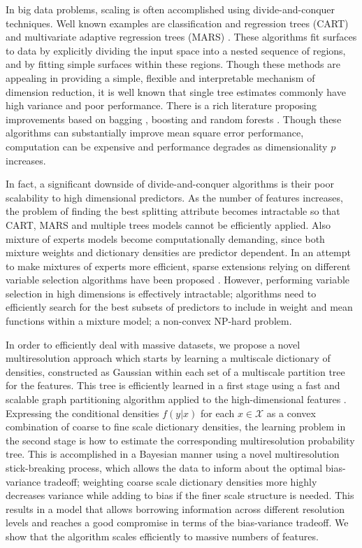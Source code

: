 \documentclass{article}
\begin{document}
In big data problems, scaling is often accomplished using divide-and-conquer techniques. Well known examples are classification and regression trees (CART) \cite{CART} and multivariate adaptive regression trees (MARS) \cite{MARS}. These algorithms fit surfaces to data by explicitly dividing the input space into a nested sequence of regions, and by fitting simple surfaces  within these regions. Though these methods are appealing in providing a simple, flexible and interpretable mechanism of dimension reduction, it is well known that single tree estimates commonly have high variance and poor performance.  There is a rich literature proposing improvements based on bagging \cite{Bagging}, boosting \cite{Boosting} and random forests \cite{RandomForest}. Though these algorithms can substantially improve mean square error performance, computation can be expensive and performance degrades as dimensionality $p$ increases.

In fact, a significant downside of divide-and-conquer algorithms is their poor scalability to high dimensional predictors. As the number of features increases, the problem of finding the best splitting attribute becomes intractable so that CART, MARS and multiple trees models cannot be efficiently applied. Also mixture of experts models become computationally demanding, since both mixture weights and dictionary densities are predictor dependent. In an attempt to make mixtures of experts more efficient, sparse extensions relying on different variable selection algorithms have been proposed \cite{SparseMoF}. However, performing variable selection in high dimensions is effectively intractable; algorithms need to efficiently search for the best subsets of predictors to include in weight and mean functions within a mixture model; a non-convex NP-hard problem.

 In order to efficiently deal with massive datasets, we propose a novel multiresolution approach which starts by learning a multiscale dictionary of densities, constructed as Gaussian within each set of a multiscale partition tree for the features. This tree is efficiently learned in a first stage using a fast and scalable graph partitioning algorithm applied to the high-dimensional features \cite{metis}.  Expressing the conditional densities $f(y|x)$ for each $x \in \mathcal{X}$ as a convex combination of coarse to fine scale dictionary densities, the learning problem in the second stage is how to estimate the corresponding multiresolution probability tree.  This is accomplished in a Bayesian manner using a novel multiresolution stick-breaking process, which allows the data to inform about the optimal bias-variance tradeoff; weighting coarse scale dictionary densities more highly decreases variance while adding to bias if the finer scale structure is needed.  This results in a model that allows borrowing information across different resolution levels and reaches a good compromise in terms of the bias-variance tradeoff. We show that the algorithm scales efficiently to massive numbers of features. 
\end{document}
